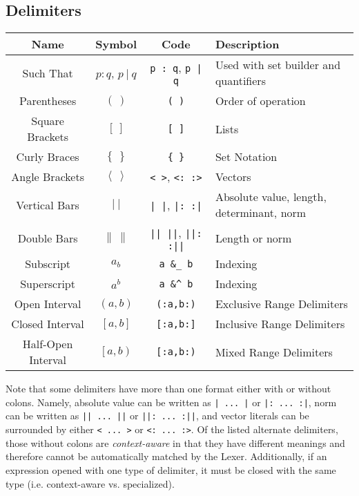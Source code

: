 \documentclass{article}
\begin{document}
  \subsection{Delimiters} %
  \label{sub:delimiters}
  \begin{table}[!h]
    \centering
    \begin{tabular}{|c|c|c|l|}
      \hline
      \textbf{Name} & \textbf{Symbol} & \textbf{Code} & \textbf{Description} \\
      \hline\hline
      
      Such That & \( p : q \), \( p ~|~ q \) & \texttt{p : \!\!q}, \texttt{p | q} & Used with set builder and quantifiers \\
      Parentheses & \( \left( \ \right) \) & \texttt{( )} & Order of operation \\
      Square Brackets & \( \left[ \ \right] \) & \texttt{[ ]} & Lists \\
      Curly Braces & \( \left\{ \ \right\} \) & \texttt{\{ \}} & Set Notation \\
      Angle Brackets & \( \left\langle \ \right\rangle \) & \texttt{< >}, \texttt{<: :>} & Vectors \\
      Vertical Bars & \( \left| \ \right| \) & \texttt{| |}, \texttt{|: :|} & Absolute value, length, determinant, norm \\
      Double Bars & \( \left\| \ \right\| \) & \texttt{|| ||}, \texttt{||: :||} & Length or norm \\
      Subscript & \( a_b \) & \texttt{a \&\_ b} & Indexing \\
      Superscript & \( a^b \) & \texttt{a \&\^{} b} & Indexing \\
      \hline
      Open Interval & \( \left( a,b \right) \) & \texttt{(:a,b:)} & Exclusive Range Delimiters \\
      Closed Interval & \( \left[ a,b \right] \) & \texttt{[:a,b:]} & Inclusive Range Delimiters \\
      Half-Open Interval & \( \left[ a,b \right) \) & \texttt{[:a,b:)} & Mixed Range Delimiters \\
      \hline
    \end{tabular}
  \end{table}
  Note that some delimiters have more than one format either with or without colons. Namely, absolute value can be
  written as \texttt{| ... |} or \texttt{|: ... :|}, norm can be written as \texttt{|| ... ||} or \texttt{||: ... :||},
  and vector literals can be surrounded by either \texttt{< ... >} or \texttt{<: ... :>}. Of the listed alternate
  delimiters, those without colons are \emph{context-aware} in that they have different meanings and therefore cannot be automatically
  matched by the Lexer. Additionally, if an expression opened with one type of delimiter, it must be closed with the
  same type (i.e. context-aware vs. specialized).
  
\end{document}

